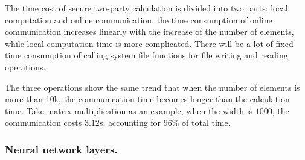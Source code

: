 \documentclass[letterpaper]{article} %
\begin{document}
    The time cost of secure two-party calculation is divided into two parts:
    local computation and online communication.
    the time consumption of online communication increases linearly with the increase of the number of elements,
    while local computation time is more complicated.
    There will be a lot of fixed time consumption of calling system file functions
    for file writing and reading operations.

    The three operations show the same trend that
    when the number of elements is more than 10k,
    the communication time becomes longer than the calculation time.
    Take matrix multiplication as an example,
    when the width is $1000$, the communication costs $3.12$s, accounting for $96\%$ of total time.

    \subsubsection{Neural network layers.}
\end{document}
